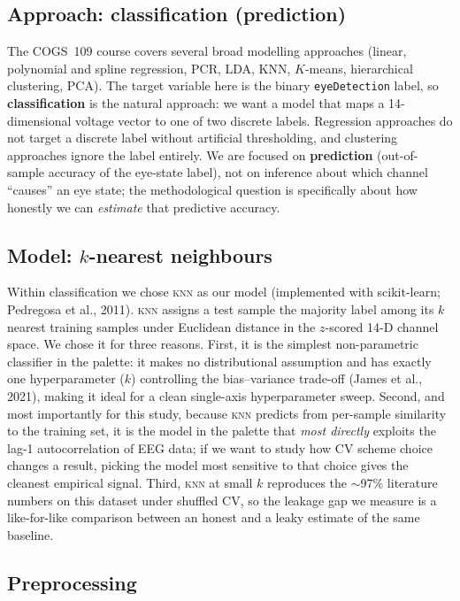 \documentclass[11pt]{article}
\newcommand{\knn}{\textsc{knn}}
\begin{document}
\subsection{Approach: classification (prediction)}

The COGS~109 course covers several broad modelling approaches (linear,
polynomial and spline regression, PCR, LDA, KNN, $K$-means, hierarchical
clustering, PCA). The target variable here is the binary
\texttt{eyeDetection} label, so \textbf{classification} is the natural
approach: we want a model that maps a 14-dimensional voltage vector to one
of two discrete labels. Regression approaches do not target a discrete
label without artificial thresholding, and clustering approaches ignore
the label entirely. We are focused on \textbf{prediction} (out-of-sample
accuracy of the eye-state label), not on inference about which channel
``causes'' an eye state; the methodological question is specifically about
how honestly we can \emph{estimate} that predictive accuracy.

\subsection{Model: $k$-nearest neighbours}

Within classification we chose \knn{} as our model (implemented with
scikit-learn; Pedregosa et al., 2011). \knn{} assigns a test sample the
majority label among its $k$ nearest training samples under Euclidean
distance in the $z$-scored 14-D channel space. We chose it for
three reasons. First, it is the simplest non-parametric classifier in the
palette: it makes no distributional assumption and has exactly one
hyperparameter ($k$) controlling the bias--variance trade-off (James et al.,
2021), making it ideal for a clean single-axis hyperparameter sweep. Second,
and most importantly for this study, because \knn{} predicts from per-sample
similarity to the training set, it is the model in the palette that
\emph{most directly} exploits the lag-1 autocorrelation of EEG data; if we
want to study how CV scheme choice changes a result, picking the model
most sensitive to that choice gives the cleanest empirical signal. Third,
\knn{} at small $k$ reproduces the $\sim$97\% literature numbers on this
dataset under shuffled CV, so the leakage gap we measure is a like-for-like
comparison between an honest and a leaky estimate of the same baseline.

\subsection{Preprocessing}
\end{document}
